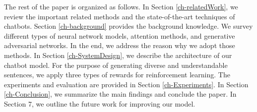 The rest of the paper is organized as follows. In Section \ref{ch-relatedWork}, we review the important related methods  and the state-of-the-art techniques of chatbots. Section \ref{ch-background} provides the background knowledge. We survey different types of neural network models, attention methods, and generative adversarial networks. In the end, we address the reason why we adopt those methods. In Section \ref{ch-SystemDesign}, we describe the architecture of our chatbot model. For the purpose of generating diverse and understandable sentences, we apply three types of rewards for reinforcement learning. The experiments and evaluation are provided in Section \ref{ch-Experiments}. In Section \ref{ch-Conclusion}, we summarize the main findings and conclude the paper.  In Section 7, we outline the future work for improving our model.
